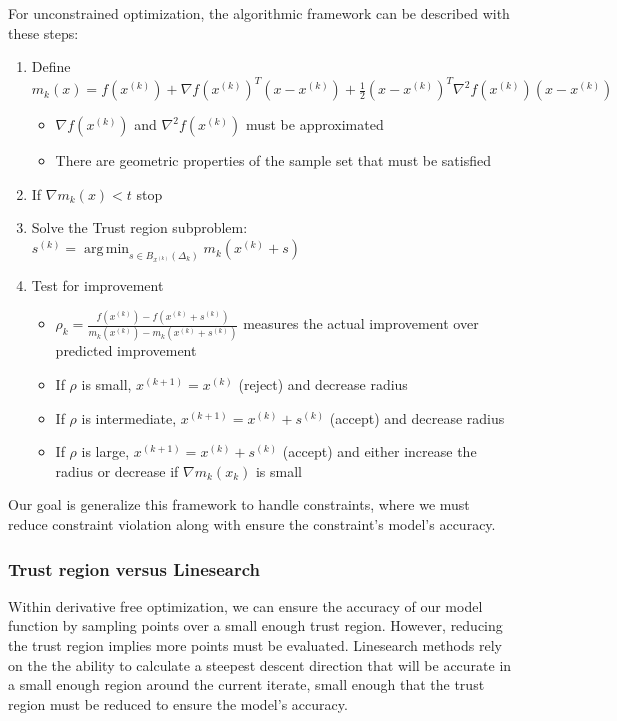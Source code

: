 \documentclass{article}
\DeclareMathOperator*{\argmin}{arg\,min}
\begin{document}
For unconstrained optimization, the algorithmic framework can be described with these steps:

\begin{enumerate}
	\item Define $m_k(x) = f(x^{(k)}) + \nabla f(x^{(k)})^T (x-x^{(k)}) + \frac 1 2 (x-x^{(k)})^T\nabla^2f(x^{(k)})(x-x^{(k)})$
	\begin{itemize}
		\item $\nabla f(x^{(k)})$ and $\nabla^2 f(x^{(k)})$ must be approximated
		\item There are geometric properties of the sample set that must be satisfied
	\end{itemize}
	\item If $\nabla m_k(x) < t$ stop
	\item Solve the Trust region subproblem: $s^{(k)} = \argmin_{s\in B_{x^{(k)}}( \Delta_k)} m_k(x^{(k)} + s)$
	\item Test for improvement
	\begin{itemize}
		\item $\rho_k = \frac{f(x^{(k)}) - f(x^{(k)}+s^{(k)})}{m_k(x^{(k)}) - m_k(x^{(k)}+s^{(k)})}$ measures the actual improvement over predicted improvement
		\item If $\rho$ is small, $x^{(k+1)}=x^{(k)}$ (reject) and decrease radius
		\item If $\rho$ is intermediate, $x^{(k+1)}=x^{(k)}+s^{(k)}$ (accept) and decrease radius
		\item If $\rho$ is large, $x^{(k+1)}=x^{(k)}+s^{(k)}$ (accept) and either increase the radius or decrease if $\nabla m_k(x_k)$ is small
	\end{itemize}
\end{enumerate}

Our goal is generalize this framework to handle constraints, where we must reduce constraint violation along with ensure the constraint's model's accuracy.

\subsubsection{Trust region versus Linesearch}

Within derivative free optimization, we can ensure the accuracy of our model function by sampling points over a small enough trust region.
However, reducing the trust region implies more points must be evaluated.
Linesearch methods rely on the the ability to calculate a steepest descent direction that will be accurate in a small enough region around the current iterate, small enough that the trust region must be reduced to ensure the model's accuracy.
\end{document}
